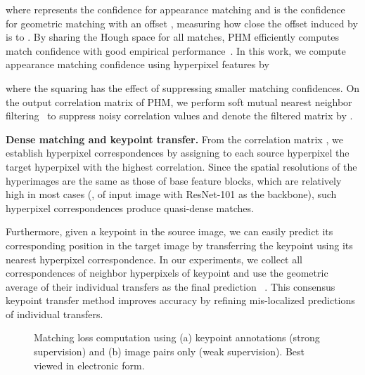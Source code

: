 \documentclass[runningheads]{llncs}
\begin{document}
where  represents the confidence for appearance matching and  is the confidence for geometric matching with an offset , measuring how close the offset induced by  is to . By sharing the Hough space  for all matches, PHM efficiently computes match confidence with good empirical performance~\cite{cho2015unsupervised,ham2016proposal,han2017scnet,min2019hyperpixel}. In this work, we compute appearance matching confidence using hyperpixel features by 

where the squaring has the effect of suppressing smaller matching confidences. 
On the output  correlation matrix of PHM, we perform soft mutual nearest neighbor filtering~\cite{rocco2018neighbourhood} to suppress noisy correlation values and denote the filtered matrix by .

\smallbreak
\noindent \textbf{Dense matching and keypoint transfer.} 
From the correlation matrix , we establish hyperpixel correspondences by assigning to each source hyperpixel  the target hyperpixel  with the highest correlation. Since the spatial resolutions of the hyperimages are the same as those of base feature blocks, which are relatively high in most cases (\eg,  of input image with ResNet-101 as the backbone), such hyperpixel correspondences produce quasi-dense matches.

Furthermore, given a keypoint  in the source image, we can easily predict its corresponding position  in the target image by transferring the keypoint using its nearest hyperpixel correspondence. In our experiments, we collect all correspondences of neighbor hyperpixels of keypoint  and use the geometric average of their individual transfers as the final prediction ~\cite{min2019hyperpixel}. 
This consensus keypoint transfer method improves accuracy by refining mis-localized predictions of individual transfers.

\begin{figure}[!tbp]
  \centering
  \begin{minipage}[b]{0.49\textwidth}
  \end{minipage}
  \hfill
  \begin{minipage}[b]{0.49\textwidth}
  \end{minipage}
  
    \caption{Matching loss computation using (a) keypoint annotations (strong supervision) and (b) image pairs only (weak supervision). Best viewed in electronic form.}
    \label{fig:loss_computation}
\end{figure}
\end{document}
